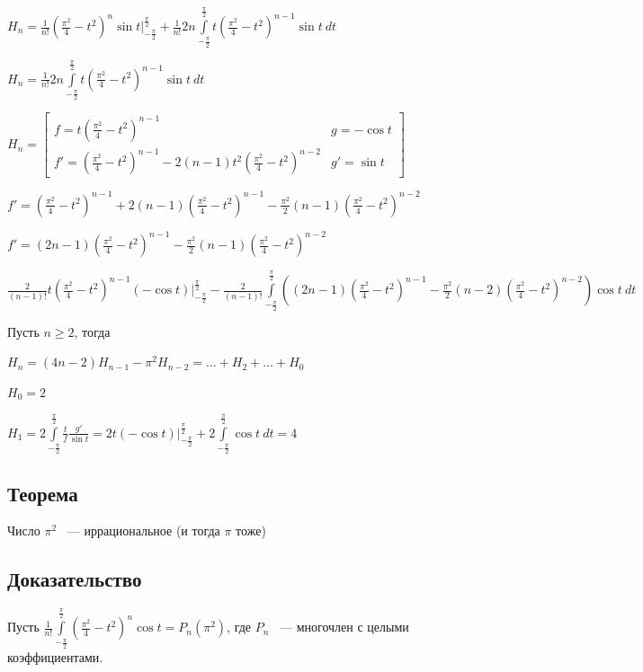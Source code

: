 \documentclass{article}
\begin{document}
			$H_n = \frac{1}{n!} (\frac{\pi^2}{4} - t^2)^n \sin t \bigg|^{\frac{\pi}{2}}_{-\frac{\pi}{2}} + \frac{1}{n!} 2n \int\limits^{\frac{\pi}{2}}_{-\frac{\pi}{2}} t (\frac{\pi^2}{4}-t^2)^{n - 1} \sin t \ dt$
			
			$H_n = \frac{1}{n!} 2n \int\limits^{\frac{\pi}{2}}_{-\frac{\pi}{2}} t (\frac{\pi^2}{4}-t^2)^{n - 1} \sin t \ dt$
			
			$H_n = \begin{bmatrix} f = t (\frac{\pi^2}{4} - t^2)^{n - 1} & g = -\cos t \\ f' = (\frac{\pi^2}{4} - t^2)^{n - 1} - 2(n - 1)t^2(\frac{\pi^2}{4} - t^2)^{n - 2} & g' = \sin t \end{bmatrix}$
			
			$f' = (\frac{\pi^2}{4} - t^2)^{n - 1} + 2(n - 1)(\frac{\pi^2}{4} - t^2)^{n - 1} - \frac{\pi^2}{2} (n - 1) (\frac{\pi^2}{4} - t^2)^{n - 2}$
			
			$f' = (2n - 1)(\frac{\pi^2}{4} - t^2)^{n - 1} - \frac{\pi^2}{2}(n - 1)(\frac{\pi^2}{4}-t^2)^{n - 2}$
			
			$\frac{2}{(n - 1)!} t (\frac{\pi^2}{4} - t^2)^{n - 1} (-\cos t) \bigg|^{\frac{\pi}{2}}_{-\frac{\pi}{2}} - \frac{2}{(n - 1)!} \int\limits^{\frac{\pi}{2}}_{-\frac{\pi}{2}} ( (2n - 1)(\frac{\pi^2}{4} - t^2)^{n - 1} - \frac{\pi^2}{2} (n - 2) (\frac{\pi^2}{4} - t^2)^{n - 2}) \cos t \ dt$
			
			Пусть $n \geq 2$, тогда
			
			$H_n = (4n - 2) H_{n - 1} - \pi^2 H_{n - 2} = \ldots + H_2 + \ldots + H_0$
			
			$H_0 = 2$
			
			$H_1 = 2 \int\limits^{\frac{\pi}{2}}_{-\frac{\pi}{2}} \frac{t}{f} \frac{g'}{\sin t} = 2t (- \cos t)\bigg|^{\frac{\pi}{2}}_{-\frac{\pi}{2}} + 2 \int\limits^{\frac{\pi}{2}}_{-\frac{\pi}{2}} \cos t \ dt = 4$
			
		\subsection{Теорема}
		
			Число $\pi^2$ ~--- иррациональное (и тогда $\pi$ тоже)
			
		\subsection{Доказательство}
		
			Пусть $\frac{1}{n!} \int\limits^{\frac{\pi}{2}}_{-\frac{\pi}{2}} (\frac{\pi^2}{4} - t^2)^n \cos t = P_n (\pi^2)$, где $P_n$ ~--- многочлен с целыми коэффициентами.
			
\end{document}
